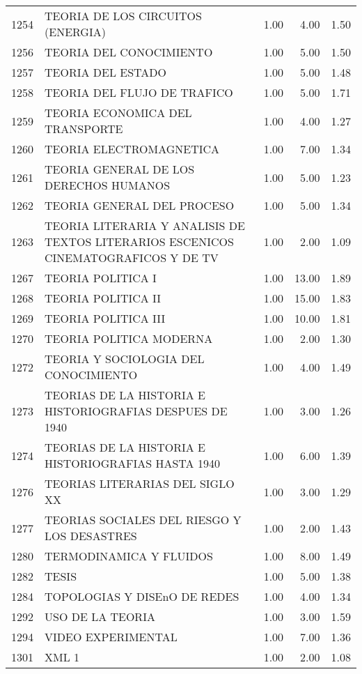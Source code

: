 \begin{table}[ht]
\begin{tabular}{rlrrr}
  1254 & TEORIA DE LOS CIRCUITOS (ENERGIA) & 1.00 & 4.00 & 1.50 \\ 
  1256 & TEORIA DEL CONOCIMIENTO & 1.00 & 5.00 & 1.50 \\ 
  1257 & TEORIA DEL ESTADO & 1.00 & 5.00 & 1.48 \\ 
  1258 & TEORIA DEL FLUJO DE TRAFICO & 1.00 & 5.00 & 1.71 \\ 
  1259 & TEORIA ECONOMICA DEL TRANSPORTE & 1.00 & 4.00 & 1.27 \\ 
  1260 & TEORIA ELECTROMAGNETICA & 1.00 & 7.00 & 1.34 \\ 
  1261 & TEORIA GENERAL DE LOS DERECHOS HUMANOS & 1.00 & 5.00 & 1.23 \\ 
  1262 & TEORIA GENERAL DEL PROCESO & 1.00 & 5.00 & 1.34 \\ 
  1263 & TEORIA LITERARIA Y ANALISIS DE TEXTOS LITERARIOS ESCENICOS CINEMATOGRAFICOS Y DE TV & 1.00 & 2.00 & 1.09 \\ 
  1267 & TEORIA POLITICA I & 1.00 & 13.00 & 1.89 \\ 
  1268 & TEORIA POLITICA II & 1.00 & 15.00 & 1.83 \\ 
  1269 & TEORIA POLITICA III & 1.00 & 10.00 & 1.81 \\ 
  1270 & TEORIA POLITICA MODERNA & 1.00 & 2.00 & 1.30 \\ 
  1272 & TEORIA Y SOCIOLOGIA DEL CONOCIMIENTO & 1.00 & 4.00 & 1.49 \\ 
  1273 & TEORIAS DE LA HISTORIA E HISTORIOGRAFIAS DESPUES DE 1940 & 1.00 & 3.00 & 1.26 \\ 
  1274 & TEORIAS DE LA HISTORIA E HISTORIOGRAFIAS HASTA 1940 & 1.00 & 6.00 & 1.39 \\ 
  1276 & TEORIAS LITERARIAS DEL SIGLO XX & 1.00 & 3.00 & 1.29 \\ 
  1277 & TEORIAS SOCIALES DEL RIESGO Y LOS DESASTRES & 1.00 & 2.00 & 1.43 \\ 
  1280 & TERMODINAMICA Y FLUIDOS & 1.00 & 8.00 & 1.49 \\ 
  1282 & TESIS & 1.00 & 5.00 & 1.38 \\ 
  1284 & TOPOLOGIAS Y DISEnO DE REDES & 1.00 & 4.00 & 1.34 \\ 
  1292 & USO DE LA TEORIA & 1.00 & 3.00 & 1.59 \\ 
  1294 & VIDEO EXPERIMENTAL & 1.00 & 7.00 & 1.36 \\ 
  1301 & XML 1 & 1.00 & 2.00 & 1.08 \\ 
   \hline
\end{tabular}
\end{table}
